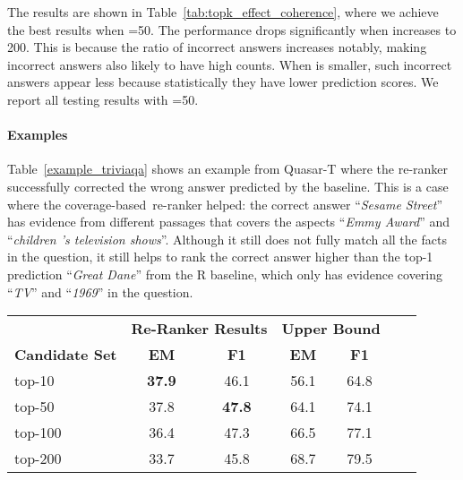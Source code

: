 \documentclass{article} \usepackage{iclr2018_conference,times}
\def \coherence {strength-based}
\def \union {coverage-based}
\begin{document}
The results are shown in Table~\ref{tab:topk_effect_coherence}, where we achieve the best results when =50. The performance drops significantly when  increases to 200. This is because the ratio of incorrect answers increases notably, making incorrect answers also likely to have high counts. When  is smaller, such incorrect answers appear less because statistically they have lower prediction scores. We report all testing results with =50.

\paragraph{Examples}
Table~\ref{example_triviaqa} shows an example from Quasar-T where the re-ranker successfully corrected the wrong answer predicted by the baseline. This is a case where the \union\ re-ranker helped: the correct answer ``\emph{Sesame Street}'' has evidence from different passages that covers the aspects ``\emph{Emmy Award}'' and ``\emph{children 's television shows}''. Although it still does not fully match all the facts in the question, it still helps to rank the correct answer higher than the top-1 prediction ``\emph{Great Dane}'' from the R baseline, which only has evidence covering ``\emph{TV}'' and ``\emph{1969}'' in the question.


\begin{table*}[t]
\centering
\begin{tabular}{lcccccc}
\toprule
                  & \multicolumn{2}{c}{\bf Re-Ranker Results} & \multicolumn{2}{c}{\bf Upper Bound} \\
    \bf Candidate Set             & \bf EM            & \bf F1            & \bf EM            & \bf F1 \\
\midrule
top-10 & \textbf{37.9} & 46.1 & 56.1 & 64.8  \\
top-50   & 37.8 & \textbf{47.8}  & 64.1 & 74.1  \\
top-100  & 36.4 & 47.3 & 66.5 & 77.1   \\
top-200  & 33.7 & 45.8 & 68.7 &  79.5  \\
\bottomrule
\end{tabular}
\normalsize
\caption{Results of running \coherence\ re-ranker (counting) on different number of top- answer candidates on Quasar-T (dev set).}
\label{tab:topk_effect_coherence}
\end{table*}
\end{document}
